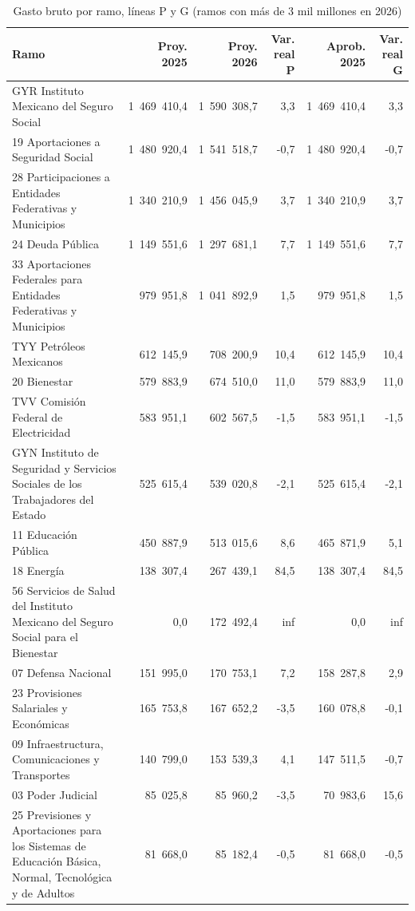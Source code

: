 \begin{table}[htbp]
\centering
\scriptsize
\caption{Gasto bruto por ramo, líneas P y G (ramos con más de 3 mil millones en 2026)}
\label{cua:C4_2}
\begin{tabular}{p{4.9cm}rrrrr}
\toprule
\textbf{Ramo} & \textbf{Proy. 2025} & \textbf{Proy. 2026} & \textbf{Var. real P} & \textbf{Aprob. 2025} & \textbf{Var. real G} \\
\midrule
GYR Instituto Mexicano del Seguro Social & 1 469 410,4 & 1 590 308,7 & 3,3 & 1 469 410,4 & 3,3 \\
19 Aportaciones a Seguridad Social & 1 480 920,4 & 1 541 518,7 & -0,7 & 1 480 920,4 & -0,7 \\
28 Participaciones a Entidades Federativas y Municipios & 1 340 210,9 & 1 456 045,9 & 3,7 & 1 340 210,9 & 3,7 \\
24 Deuda Pública & 1 149 551,6 & 1 297 681,1 & 7,7 & 1 149 551,6 & 7,7 \\
33 Aportaciones Federales para Entidades Federativas y Municipios & 979 951,8 & 1 041 892,9 & 1,5 & 979 951,8 & 1,5 \\
TYY Petróleos Mexicanos & 612 145,9 & 708 200,9 & 10,4 & 612 145,9 & 10,4 \\
20 Bienestar & 579 883,9 & 674 510,0 & 11,0 & 579 883,9 & 11,0 \\
TVV Comisión Federal de Electricidad & 583 951,1 & 602 567,5 & -1,5 & 583 951,1 & -1,5 \\
GYN Instituto de Seguridad y Servicios Sociales de los Trabajadores del Estado & 525 615,4 & 539 020,8 & -2,1 & 525 615,4 & -2,1 \\
11 Educación Pública & 450 887,9 & 513 015,6 & 8,6 & 465 871,9 & 5,1 \\
18 Energía & 138 307,4 & 267 439,1 & 84,5 & 138 307,4 & 84,5 \\
56 Servicios de Salud del Instituto Mexicano del Seguro Social para el Bienestar & 0,0 & 172 492,4 & inf & 0,0 & inf \\
07 Defensa Nacional & 151 995,0 & 170 753,1 & 7,2 & 158 287,8 & 2,9 \\
23 Provisiones Salariales y Económicas & 165 753,8 & 167 652,2 & -3,5 & 160 078,8 & -0,1 \\
09 Infraestructura, Comunicaciones y Transportes & 140 799,0 & 153 539,3 & 4,1 & 147 511,5 & -0,7 \\
03 Poder Judicial & 85 025,8 & 85 960,2 & -3,5 & 70 983,6 & 15,6 \\
25 Previsiones y Aportaciones para los Sistemas de Educación Básica, Normal, Tecnológica y de Adultos & 81 668,0 & 85 182,4 & -0,5 & 81 668,0 & -0,5 \\

\end{tabular}
\end{table}
